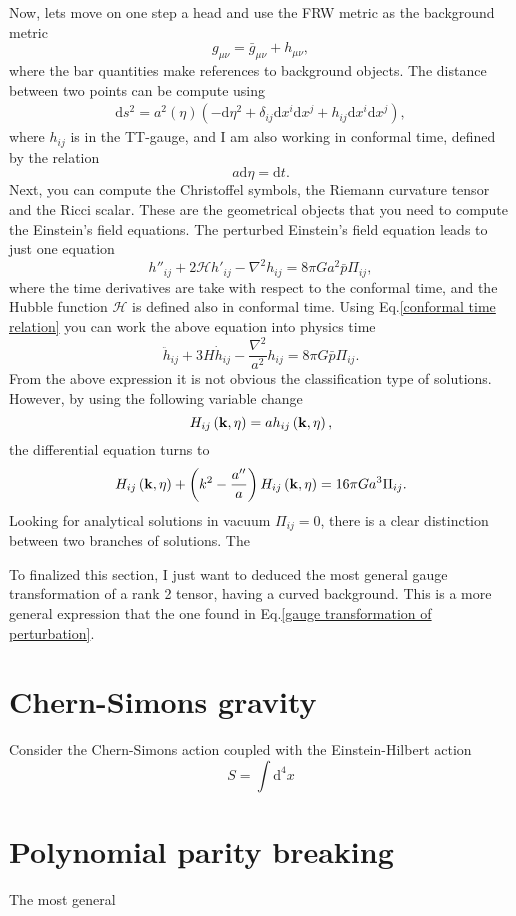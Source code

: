 \documentclass{article}
\begin{document}
Now, lets move on one step a head and use the FRW metric as the background metric
\begin{equation}
    g_{\mu\nu} = \bar{g}_{\mu\nu} + h_{\mu\nu},
\end{equation}
where the bar quantities make references to background objects. The distance between two
points can be compute using
\begin{align}
    \mathrm{d}s^{2} = a^{2}(\eta)\left(-\mathrm{d}\eta^2 
    + \delta_{ij}\mathrm{d}x^{i}\mathrm{d}x^{j}
    + h_{ij}\mathrm{d}x^{i}\mathrm{d}x^{j}\right),
\end{align}
where $h_{ij}$ is in the TT-gauge, and I am also working in conformal time, defined 
by the relation 
\begin{equation}
    \label{conformal time relation}
    a\mathrm{d}\eta = \mathrm{d}t.
\end{equation} 
Next, you can compute the Christoffel symbols, the Riemann curvature tensor and the 
Ricci scalar. These are the geometrical objects that you need to compute the Einstein's 
field equations. The perturbed Einstein's field equation leads to just one equation
\begin{equation}
    h''_{ij} + 2\mathcal{H}h'_{ij} - \nabla^{2}h_{ij} = 8\pi G a^{2}\bar{p}\Pi_{ij},
\end{equation}
where the time derivatives are take with respect to the conformal time, and the Hubble function
$\mathcal{H}$ is defined also in conformal time. Using Eq.\eqref{conformal time relation} you can
work the above equation into physics time
\begin{equation}
    \ddot{h}_{ij} + 3H\dot{h}_{ij} - \frac{\nabla^{2}}{a^{2}}h_{ij} = 8\pi G \bar{p}\Pi_{ij}.
\end{equation}
From the above expression it is not obvious the classification type of solutions. However,
by using the following variable change
\begin{equation}
    H_{ij}\left(\bold{k},\eta\right) = a h_{ij}\left(\bold{k},\eta\right),
\end{equation}
the differential equation turns to 
\begin{equation}
    H_{ij}\left(\bold{k},\eta\right) + \left(k^2 - \frac{a''}{a}\right)H_{ij}\left(\bold{k},\eta\right)
    = 16\pi G a^3\Pi_{ij}.
\end{equation}
Looking for analytical solutions in vacuum $\Pi_{ij} = 0$, there is a clear distinction between
two branches of solutions. The

To finalized this section, I just want to deduced the most general gauge transformation
of a rank 2 tensor, having a curved background. This is a more general expression that the one
found in Eq.\eqref{gauge transformation of perturbation}. 

\section{Chern-Simons gravity}

Consider the Chern-Simons action coupled with the Einstein-Hilbert action
\begin{equation}
    S = \int \mathrm{d}^4x 
\end{equation}

\section{Polynomial parity breaking}

The most general 




\end{document}
